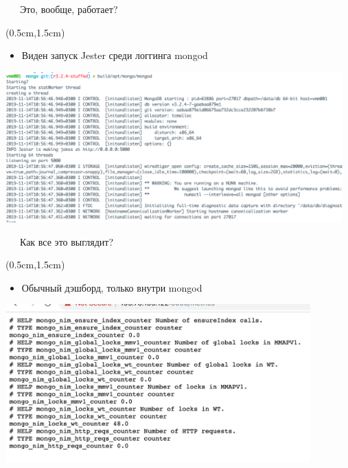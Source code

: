 \documentclass[xetex,18pt,aspectratio=43]{beamer}
\begin{document}
\begin{Large}
\begin{frame}{\ \ \  Это, вообще, работает?}
\begin{textblock*}{\framewidth-0.8cm}(0.5cm,1.5cm)
\begin{itemize}
  \item Виден запуск Jester среди логгинга mongod
\end{itemize}
\begin{minipage}{\textwidth}
  \centering
  \includegraphics[height=5.8cm]{img/start}
\end{minipage}
\end{textblock*}
\end{frame}

\begin{frame}{\ \ \  Как все это выглядит?}
\begin{textblock*}{\framewidth-0.8cm}(0.5cm,1.5cm)
\begin{itemize}
  \item Обычный дэшборд, только внутри mongod
\end{itemize}
\begin{minipage}{\textwidth}
  \centering
  \includegraphics[height=6.1cm]{img/dashboard}
\end{minipage}
\end{textblock*}
\end{frame}


\end{Large}
\end{document}
